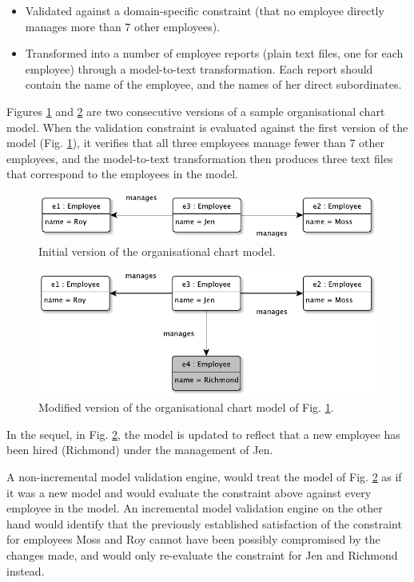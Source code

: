 \documentclass{llncs}
\begin{document}
\begin{itemize}
\item Validated against a domain-specific constraint (that no employee directly manages more than 7 other employees).
\item Transformed into a number of employee reports (plain text files, one for each employee) through a model-to-text transformation. Each report should contain the name of the employee, and the names of her direct subordinates.
\end{itemize}

Figures \ref{image1} and \ref{image2} are two consecutive versions of a sample organisational chart model. When the validation constraint is evaluated against the first version of the model (Fig. \ref{image1}), it verifies that all three employees manage fewer than 7 other employees, and the model-to-text transformation then produces three text files that correspond to the employees in the model.

\begin{figure}[b!]
\centering
\includegraphics[width=\linewidth]{image1}
\caption{Initial version of the organisational chart model.}
\label{image1}
\end{figure}

\begin{figure}[b!]
\centering
\includegraphics[width=\linewidth]{image2}
\caption{Modified version of the organisational chart model of Fig. \ref{image1}.}
\label{image2}
\end{figure}

In the sequel, in Fig. \ref{image2}, the model is updated to reflect that a new employee has been hired (Richmond) under the management of Jen. 

A non-incremental model validation engine, would treat the model of Fig. \ref{image2} as if it was a new model and would evaluate the constraint above against every employee in the model. An incremental model validation engine on the other hand would identify that the previously established satisfaction of the constraint for employees Moss and Roy cannot have been possibly compromised by the changes made, and would only re-evaluate the constraint for Jen and Richmond instead. 
\end{document}
